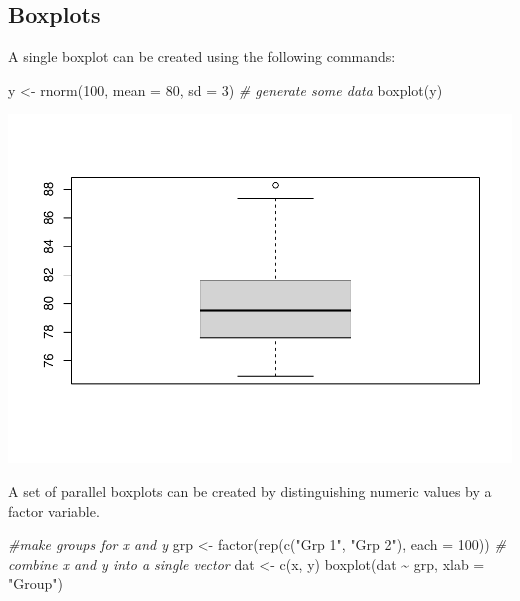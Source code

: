 \documentclass[
]{article}
\newenvironment{Shaded}{\begin{snugshade}}{\end{snugshade}}
\newcommand{\AttributeTok}[1]{\textcolor[rgb]{0.77,0.63,0.00}{#1}}
\newcommand{\CommentTok}[1]{\textcolor[rgb]{0.56,0.35,0.01}{\textit{#1}}}
\newcommand{\DecValTok}[1]{\textcolor[rgb]{0.00,0.00,0.81}{#1}}
\newcommand{\FunctionTok}[1]{\textcolor[rgb]{0.00,0.00,0.00}{#1}}
\newcommand{\NormalTok}[1]{#1}
\newcommand{\OtherTok}[1]{\textcolor[rgb]{0.56,0.35,0.01}{#1}}
\newcommand{\SpecialCharTok}[1]{\textcolor[rgb]{0.00,0.00,0.00}{#1}}
\newcommand{\StringTok}[1]{\textcolor[rgb]{0.31,0.60,0.02}{#1}}
\begin{document}
\hypertarget{boxplots}{%
\subsection{Boxplots}\label{boxplots}}

A single boxplot can be created using the following commands:

\begin{Shaded}
\begin{Highlighting}[]
\NormalTok{y }\OtherTok{\textless{}{-}} \FunctionTok{rnorm}\NormalTok{(}\DecValTok{100}\NormalTok{, }\AttributeTok{mean =} \DecValTok{80}\NormalTok{, }\AttributeTok{sd =} \DecValTok{3}\NormalTok{) }\CommentTok{\# generate some data}
\FunctionTok{boxplot}\NormalTok{(y)}
\end{Highlighting}
\end{Shaded}

\includegraphics{crash-course-in-r_files/figure-latex/unnamed-chunk-18-1.pdf}

A set of parallel boxplots can be created by distinguishing numeric
values by a factor variable.

\begin{Shaded}
\begin{Highlighting}[]
 \CommentTok{\#make groups for x and y}
\NormalTok{grp }\OtherTok{\textless{}{-}} \FunctionTok{factor}\NormalTok{(}\FunctionTok{rep}\NormalTok{(}\FunctionTok{c}\NormalTok{(}\StringTok{"Grp 1"}\NormalTok{, }\StringTok{"Grp 2"}\NormalTok{), }\AttributeTok{each =} \DecValTok{100}\NormalTok{))}
\CommentTok{\# combine x and y into a single vector}
\NormalTok{dat }\OtherTok{\textless{}{-}} \FunctionTok{c}\NormalTok{(x, y)}
\FunctionTok{boxplot}\NormalTok{(dat }\SpecialCharTok{\textasciitilde{}}\NormalTok{ grp, }\AttributeTok{xlab =} \StringTok{"Group"}\NormalTok{)}
\end{Highlighting}
\end{Shaded}
\end{document}
